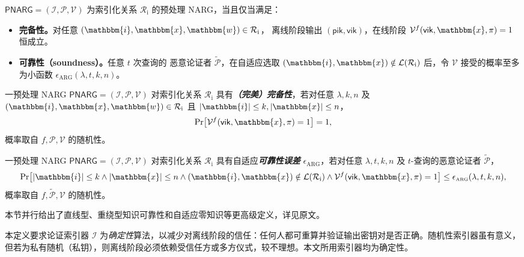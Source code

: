 \documentclass[american,singlepageview]{snargs-book-zh}
\newcommand{\defemph}[1]{\textbf{\emph{#1}}}
\newcommand{\Malicious}[1]{\tilde{#1}}
\newcommand{\SomeSize}[1]{|#1|}
\newcommand{\Language}{\mathcal{L}}
\newcommand{\GetLanguage}[1]{\Language(#1)}
\newcommand{\IndexedRelation}{\mathcal{R}_{\mathrm{i}}}
\newcommand{\Index}{\mathbbm{i}}
\newcommand{\Instance}{\mathbbm{x}}
\newcommand{\Witness}{\mathbbm{w}}
\newcommand{\IndexSize}{k}
\newcommand{\InstanceSize}{n}
\newcommand{\ProtoIndexer}{I}
\newcommand{\ProtoProver}{P}
\newcommand{\ProtoVerifier}{V}
\newcommand{\ProtoSoundnessError}{\epsilon}
\newcommand{\ARGSubscript}{\scriptscriptstyle\mathrm{ARG}}
\newcommand{\ARGFormat}[1]{\mathcal{#1}}
\newcommand{\ARGIndexer}{\ARGFormat{\ProtoIndexer}}
\newcommand{\ARGProver}{\ARGFormat{\ProtoProver}}
\newcommand{\ARGVerifier}{\ARGFormat{\ProtoVerifier}}
\newcommand{\ARGString}{\pi}
\newcommand{\ARGSoundnessError}{\ProtoSoundnessError_{\ARGSubscript}}
\newcommand{\PNARGSymbol}{\mathsf{PNARG}}
\newcommand{\PARGSystem}{(\ARGIndexer,\ARGProver,\ARGVerifier)}
\newcommand{\ARGpik}{\mathsf{pik}}
\newcommand{\ARGvik}{\mathsf{vik}}
\newcommand{\ROFunction}{f}
\newcommand{\ROQueryBound}{t}
\newcommand{\SecurityParameter}{\lambda}
\begin{document}
$\PNARGSymbol=\PARGSystem$ 为索引化关系 $\IndexedRelation$ 的预处理 NARG，当且仅当满足：
\begin{itemize}
  \item \textbf{完备性。}对任意 $(\Index,\Instance,\Witness)\in\IndexedRelation$，
    离线阶段输出 $(\ARGpik,\ARGvik)$，在线阶段
    $\ARGVerifier^{\ROFunction}(\ARGvik,\Instance,\ARGString)=1$ 恒成立。
  \item \textbf{可靠性（soundness）。}任意 $\ROQueryBound$ 次查询的
    恶意论证者 $\Malicious{\ARGProver}$，在自适应选取
    $(\Index,\Instance)\notin\GetLanguage{\IndexedRelation}$ 后，令
    $\ARGVerifier$ 接受的概率至多为小函数
    $\ARGSoundnessError(\SecurityParameter,\ROQueryBound,\IndexSize,\InstanceSize)$。
\end{itemize}

\begin{definition}
\label{definition:preprocessing-narg-completeness-with-cnf}
一预处理 NARG $\PNARGSymbol=\PARGSystem$ 对索引化关系 $\IndexedRelation$
具有\defemph{（完美）完备性}，若对任意
$\SecurityParameter,\IndexSize,\InstanceSize$ 及
$(\Index,\Instance,\Witness)\in\IndexedRelation$ 且
$\SomeSize{\Index}\le\IndexSize,\SomeSize{\Instance}\le\InstanceSize$，
\[
  \Pr\bigl[
    \ARGVerifier^{\ROFunction}(\ARGvik,\Instance,\ARGString)=1
  \bigr]=1,
\]
概率取自 $\ROFunction,\ARGProver,\ARGVerifier$ 的随机性。
\end{definition}

\begin{definition}
\label{definition:preprocessing-narg-adaptive-soundness-with-cnf}
一预处理 NARG $\PNARGSymbol=\PARGSystem$ 对索引化关系 $\IndexedRelation$
具有自适应\defemph{可靠性误差} $\ARGSoundnessError$，若对任意
$\SecurityParameter,\ROQueryBound,\IndexSize,\InstanceSize$ 及
$\ROQueryBound$-查询的恶意论证者 $\Malicious{\ARGProver}$，
\[
  \Pr\bigl[
    \SomeSize{\Index}\le\IndexSize
    \land\SomeSize{\Instance}\le\InstanceSize
    \land(\Index,\Instance)\notin\GetLanguage{\IndexedRelation}
    \land\ARGVerifier^{\ROFunction}(\ARGvik,\Instance,\ARGString)=1
  \bigr]
  \le
  \ARGSoundnessError(\SecurityParameter,\ROQueryBound,\IndexSize,\InstanceSize),
\]
概率取自 $\ROFunction,\Malicious{\ARGProver},\ARGVerifier$ 的随机性。
\end{definition}

本节并行给出了直线型、重绕型知识可靠性和自适应零知识等更高级定义，详见原文。

\begin{remark}
\label{remark:probabilistic-argument-indexer}
本定义要求论证索引器 $\ARGIndexer$ 为\emph{确定性}算法，以减少对离线阶段的信任：任何人都可重算并验证输出密钥对是否正确。随机性索引器虽有意义，但若为私有随机（私钥），则离线阶段必须依赖受信任方或多方仪式，较不理想。本文所用索引器均为确定性。
\end{remark}
\end{document}
